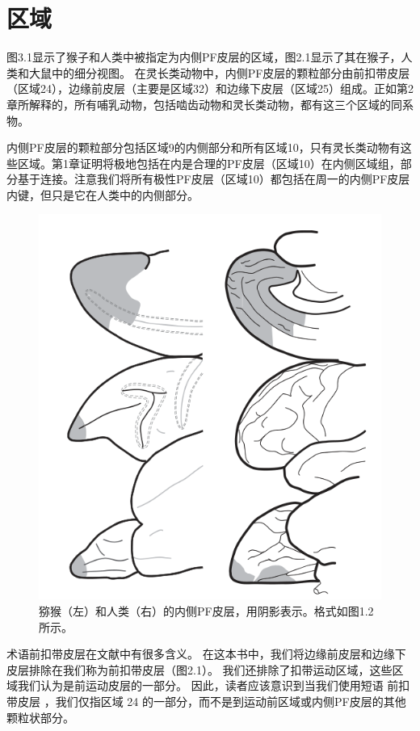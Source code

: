 \section{区域}

图3.1显示了猴子和人类中被指定为内侧PF皮层的区域，图2.1显示了其在猴子，人类和大鼠中的细分视图。
在灵长类动物中，内侧PF皮层的颗粒部分由前扣带皮层（区域24），边缘前皮层（主要是区域32）和边缘下皮层（区域25）组成。正如第2章所解释的，所有哺乳动物，包括啮齿动物和灵长类动物，都有这三个区域的同系物。\par
内侧PF皮层的颗粒部分包括区域9的内侧部分和所有区域10，只有灵长类动物有这些区域。第1章证明将极地包括在内是合理的PF皮层（区域10）在内侧区域组，部分基于连接。注意我们将所有极性PF皮层（区域10）都包括在周一的内侧PF皮层内键，但只是它在人类中的内侧部分。


\begin{figure}[!htb]
	\centering
	\includegraphics{image_pfc/Fig_3_1}
	\caption{猕猴（左）和人类（右）的内侧PF皮层，用阴影表示。格式如图1.2所示。}
	\label{fig:fig}
\end{figure}


术语前扣带皮层在文献中有很多含义。
在这本书中，我们将边缘前皮层和边缘下皮层排除在我们称为前扣带皮层（图2.1）。
我们还排除了扣带运动区域，这些区域我们认为是前运动皮层的一部分。
因此，读者应该意识到当我们使用短语 前扣带皮层 ，我们仅指区域 24 的一部分，而不是到运动前区域或内侧PF皮层的其他颗粒状部分。\par


